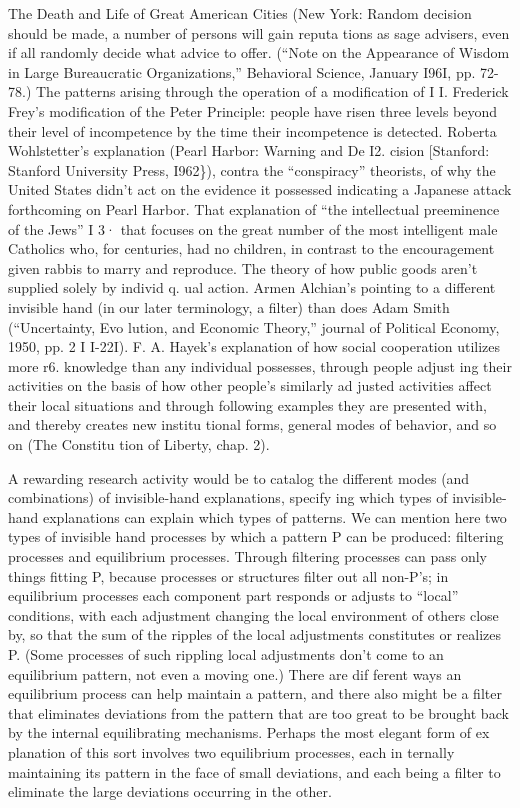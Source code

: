 \documentclass[11pt,openany]{book}
\begin{document}
The Death and Life of Great American Cities (New York: Random decision should be made, a number of persons will gain reputa tions as sage advisers, even if all randomly decide what advice to offer. (``Note on the Appearance of Wisdom in Large Bureaucratic Organizations,'' Behavioral Science, January I96I, pp. 72-78.) The patterns arising through the operation of a modification of I I. Frederick Frey's modification of the Peter Principle: people have risen three levels beyond their level of incompetence by the time their incompetence is detected. Roberta Wohlstetter's explanation (Pearl Harbor: Warning and De I2. cision [Stanford: Stanford University Press, I962\}), contra the ``conspiracy'' theorists, of why the United States didn't act on the evidence it possessed indicating a Japanese attack forthcoming on Pearl Harbor. That explanation of ``the intellectual preeminence of the Jews'' I 3· that focuses on the great number of the most intelligent male Catholics who, for centuries, had no children, in contrast to the encouragement given rabbis to marry and reproduce. The theory of how public goods aren't supplied solely by individ q. ual action. Armen Alchian's pointing to a different invisible hand (in our later terminology, a filter) than does Adam Smith (``Uncertainty, Evo lution, and Economic Theory,'' journal of Political Economy, 1950, pp. 2 I I-22I). F. A. Hayek's explanation of how social cooperation utilizes more r6. knowledge than any individual possesses, through people adjust ing their activities on the basis of how other people's similarly ad justed activities affect their local situations and through following examples they are presented with, and thereby creates new institu tional forms, general modes of behavior, and so on (The Constitu tion of Liberty, chap. 2). 

A rewarding research activity would be to catalog the different modes (and combinations) of invisible-hand explanations, specify ing which types of invisible-hand explanations can explain which types of patterns. We can mention here two types of invisible hand processes by which a pattern P can be produced: filtering processes and equilibrium processes. Through filtering processes can pass only things fitting P, because processes or structures filter out all non-P's; in equilibrium processes each component part responds or adjusts to ``local'' conditions, with each adjustment changing the local environment of others close by, so that the sum of the ripples of the local adjustments constitutes or realizes P. (Some processes of such rippling local adjustments don't come to an equilibrium pattern, not even a moving one.) There are dif ferent ways an equilibrium process can help maintain a pattern, and there also might be a filter that eliminates deviations from the pattern that are too great to be brought back by the internal equilibrating mechanisms. Perhaps the most elegant form of ex planation of this sort involves two equilibrium processes, each in ternally maintaining its pattern in the face of small deviations, and each being a filter to eliminate the large deviations occurring in the other. 
\end{document}
